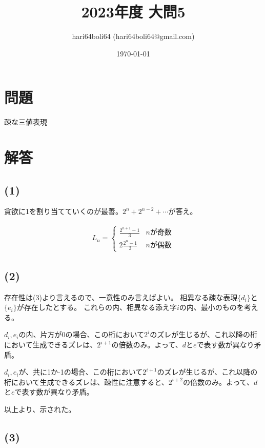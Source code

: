 \documentclass[a4paper, 10pt, dvipdfmx]{jlreq}
\begin{document}
\title{2023年度 大問5}
\author{hari64boli64 (hari64boli64@gmail.com)}
\date{\today}
\maketitle

\section{問題}

疎な三値表現

\section{解答}

\subsection*{(1)}

貪欲に1を割り当てていくのが最善。$2^n+2^{n-2}+\cdots$が答え。

\begin{align*}
  L_n=\begin{cases}
        \frac{2^{n+1}-1}{3} & n\text{が奇数} \\
        2\frac{2^{n}-1}{3}  & n\text{が偶数}
      \end{cases}
\end{align*}

\subsection*{(2)}

存在性は(3)より言えるので、一意性のみ言えばよい。
相異なる疎な表現$\{d_i\}$と$\{e_i\}$が存在したとする。
これらの内、相異なる添え字$i$の内、最小のものを考える。

$d_i,e_i$の内、片方が0の場合、この桁において$2^i$のズレが生じるが、これ以降の桁において生成できるズレは、$2^{i+1}$の倍数のみ。よって、$d$と$e$で表す数が異なり矛盾。

$d_i,e_i$が、共に1か-1の場合、この桁において$2^{i+1}$のズレが生じるが、これ以降の桁において生成できるズレは、疎性に注意すると、$2^{i+2}$の倍数のみ。よって、$d$と$e$で表す数が異なり矛盾。

以上より、示された。

\subsection*{(3)}
\end{document}
